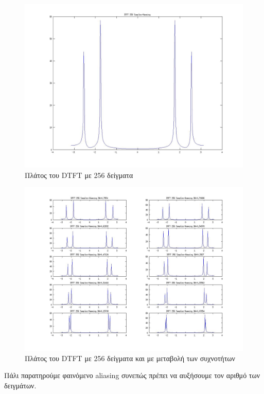 \documentclass[a4paper,10pt]{article} \usepackage{anysize}
\begin{document}
\begin{figure}[H]
\caption{Πλάτος του DTFT με 256 δείγματα}
\centering
	\includegraphics[scale=0.4]{files/12-DTFT_256_Samples-Hamming.jpg}
\end{figure}
\begin{figure}[H]
\caption{Πλάτος του DTFT με 256 δείγματα και με μεταβολή των συχνοτήτων}
\centering
	\includegraphics[scale=0.4]{files/13-DTFT_256_Samples-Hamming.jpg}
\end{figure}
Πάλι παρατηρούμε φαινόμενο aliasing συνεπώς πρέπει να αυξήσουμε τον αριθμό των
δειγμάτων.
\end{document}
